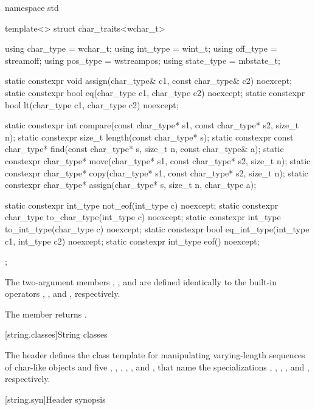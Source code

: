 %
\begin{codeblock}
namespace std {
  template<> struct char_traits<wchar_t> {
    using char_type  = wchar_t;
    using int_type   = wint_t;
    using off_type   = streamoff;
    using pos_type   = wstreampos;
    using state_type = mbstate_t;

    static constexpr void assign(char_type& c1, const char_type& c2) noexcept;
    static constexpr bool eq(char_type c1, char_type c2) noexcept;
    static constexpr bool lt(char_type c1, char_type c2) noexcept;

    static constexpr int compare(const char_type* s1, const char_type* s2, size_t n);
    static constexpr size_t length(const char_type* s);
    static constexpr const char_type* find(const char_type* s, size_t n,
                                           const char_type& a);
    static constexpr char_type* move(char_type* s1, const char_type* s2, size_t n);
    static constexpr char_type* copy(char_type* s1, const char_type* s2, size_t n);
    static constexpr char_type* assign(char_type* s, size_t n, char_type a);

    static constexpr int_type not_eof(int_type c) noexcept;
    static constexpr char_type to_char_type(int_type c) noexcept;
    static constexpr int_type to_int_type(char_type c) noexcept;
    static constexpr bool eq_int_type(int_type c1, int_type c2) noexcept;
    static constexpr int_type eof() noexcept;
  };
}
\end{codeblock}


\pnum
The two-argument members
,
,
and
are defined identically
to the built-in operators
\tcode{=},
\tcode{==},
and
\tcode{<},
respectively.

\pnum
The member
returns
.

[string.classes]{String classes}

\pnum
The header  defines the
 class template for manipulating
varying-length sequences of char-like objects and five
, ,
,
,
,
and , that name
the specializations
,
,
,
,
and
, respectively.

[string.syn]{Header  synopsis}
%

